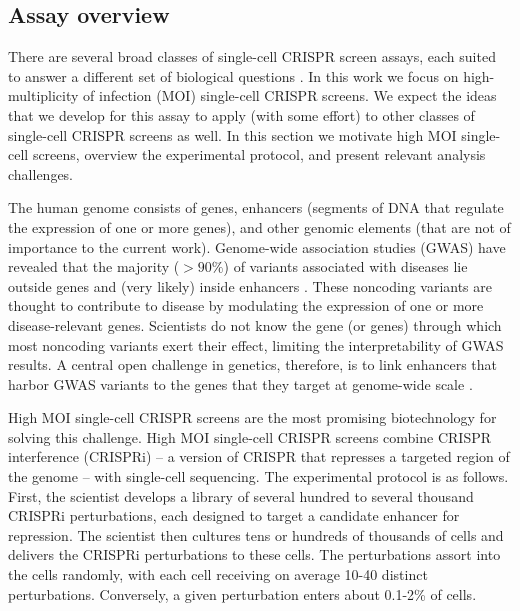\documentclass[12pt]{article}
\begin{document}

\subsection{Assay overview}

There are several broad classes of single-cell CRISPR screen assays, each suited to answer a different set of biological questions \cite{Gasperini2019,Datlinger2021,Mimitou2019}. In this work we focus on high-multiplicity of infection (MOI) single-cell CRISPR screens. We expect the ideas that we develop for this assay to apply (with some effort) to other classes of single-cell CRISPR screens as well. In this section we motivate high MOI single-cell screens, overview the experimental protocol, and present relevant analysis challenges.

The human genome consists of genes, enhancers (segments of DNA that regulate the expression of one or more genes), and other genomic elements (that are not of importance to the current work). Genome-wide association studies (GWAS) have revealed that the majority ($>90\%$) of variants associated with diseases lie outside genes and (very likely) inside enhancers \cite{Gallagher2018}. These noncoding variants are thought to contribute to disease by modulating the expression of one or more disease-relevant genes. Scientists do not know the gene (or genes) through which most noncoding variants exert their effect, limiting the interpretability of GWAS results. A central open challenge in genetics, therefore, is to link enhancers that harbor GWAS variants to the genes that they target at genome-wide scale \cite{Gasperini2020}.

High MOI single-cell CRISPR screens are the most promising biotechnology for solving this challenge. High MOI single-cell CRISPR screens combine CRISPR interference (CRISPRi) -- a version of CRISPR that represses a targeted region of the genome -- with single-cell sequencing. The experimental protocol is as follows. First, the scientist develops a library of several hundred to several thousand CRISPRi perturbations, each designed to target a candidate enhancer for repression. The scientist then cultures tens or hundreds of thousands of cells and delivers the CRISPRi perturbations to these cells. The perturbations assort into the cells randomly, with each cell receiving on average 10-40 distinct perturbations. Conversely, a given perturbation enters about 0.1-2\% of cells. 
\end{document}
